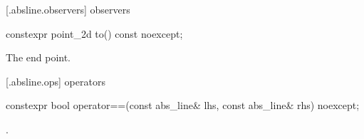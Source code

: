  [\iotwod.absline.observers]{ observers}

%
\begin{itemdecl}
constexpr point_2d to() const noexcept;
\end{itemdecl}
\begin{itemdescr}
\pnum
\returns
The end point.
\end{itemdescr}

 [\iotwod.absline.ops]{ operators}

%
\begin{itemdecl}
constexpr bool operator==(const abs_line& lhs, const abs_line& rhs) noexcept;
\end{itemdecl}
\begin{itemdescr}
\pnum
\returns
{}.
\end{itemdescr}
